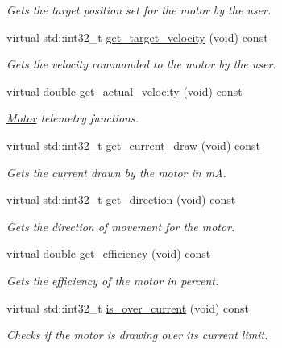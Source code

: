 \begin{DoxyCompactItemize}
\begin{DoxyCompactList}\small\item\em Gets the target position set for the motor by the user. \end{DoxyCompactList}\item 
virtual std\+::int32\+\_\+t \mbox{\hyperlink{classpros_1_1Motor_a8b8148a179cfadd579c8d4c82eb5873f}{get\+\_\+target\+\_\+velocity}} (void) const
\begin{DoxyCompactList}\small\item\em Gets the velocity commanded to the motor by the user. \end{DoxyCompactList}\item 
virtual double \mbox{\hyperlink{classpros_1_1Motor_a696494a4e7c675f7007d41b947f9ea63}{get\+\_\+actual\+\_\+velocity}} (void) const
\begin{DoxyCompactList}\small\item\em \mbox{\hyperlink{classpros_1_1Motor}{Motor}} telemetry functions. \end{DoxyCompactList}\item 
virtual std\+::int32\+\_\+t \mbox{\hyperlink{classpros_1_1Motor_a502eaf3859452721e2327e53ab3f34d8}{get\+\_\+current\+\_\+draw}} (void) const
\begin{DoxyCompactList}\small\item\em Gets the current drawn by the motor in mA. \end{DoxyCompactList}\item 
virtual std\+::int32\+\_\+t \mbox{\hyperlink{classpros_1_1Motor_acea42a96da651f72f138ea268c76217f}{get\+\_\+direction}} (void) const
\begin{DoxyCompactList}\small\item\em Gets the direction of movement for the motor. \end{DoxyCompactList}\item 
virtual double \mbox{\hyperlink{classpros_1_1Motor_a6f0b39894abf612a1965a66224893c71}{get\+\_\+efficiency}} (void) const
\begin{DoxyCompactList}\small\item\em Gets the efficiency of the motor in percent. \end{DoxyCompactList}\item 
virtual std\+::int32\+\_\+t \mbox{\hyperlink{classpros_1_1Motor_a2d34c92effccfbb4d2f45319bf4bd272}{is\+\_\+over\+\_\+current}} (void) const
\begin{DoxyCompactList}\small\item\em Checks if the motor is drawing over its current limit. \end{DoxyCompactList}\item 

\end{DoxyCompactItemize}
